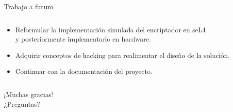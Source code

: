 \documentclass[serif, aspectratio=169]{beamer}
\begin{document}
\begin{frame}{Trabajo a futuro}
    \begin{columns}
        \begin{column}{0.9\textwidth}
            \begin{itemize}
                \item Reformular la implementación simulada del encriptador en seL4 \\ y posteriormente implementarlo en hardware.
                \item Adquirir conceptos de hacking para realimentar el diseño de la solución.
                \item Continuar con la documentación del proyecto.
            \end{itemize}
        \end{column}
    \end{columns}


\end{frame}

\begin{frame}
    \begin{center}
        \Huge ¡Muchas gracias! \\
        \Huge ¿Preguntas?
    \end{center}
\end{frame}

\end{document}
